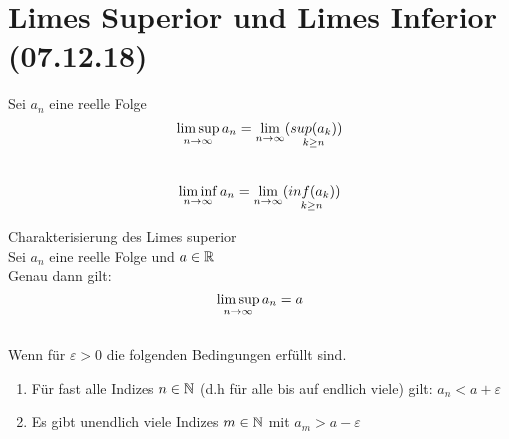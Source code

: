 \documentclass[../ana1u.tex]{subfiles}
\begin{document}
\setcounter{section}{6}

\section{Limes Superior und Limes Inferior (07.12.18)}
\begin{defi}
    Sei \(a_n\) eine reelle Folge\\
    \[\limsup\limits_{n\rightarrow\infty} a_n = \lim\limits_{n\rightarrow\infty} (\underset{k \geq n}{sup(a_k)}) \]\\
    \[\liminf\limits_{n\rightarrow\infty} a_n = \lim\limits_{n\rightarrow\infty} (\underset{k \geq n}{inf(a_k)}) \]
\end{defi}
\begin{satz}
    Charakterisierung des Limes superior\\
    Sei \(a_n\) eine reelle Folge und \(a \in \mathbb{R}\)\\
    Genau dann gilt:\\
    \[\limsup\limits_{n\rightarrow\infty} a_n = a\]\\
    Wenn für \(\varepsilon > 0\) die folgenden Bedingungen erfüllt sind.\\
    \begin{enumerate}
        \item Für fast alle Indizes \(n \in \mathbb{N}\) (d.h für alle bis auf endlich viele) gilt: \(a_n < a+ \varepsilon\)
        \item Es gibt unendlich viele Indizes \(m \in \mathbb{N}\) mit \(a_m > a - \varepsilon\)
    \end{enumerate}
\end{satz}
\end{document}
